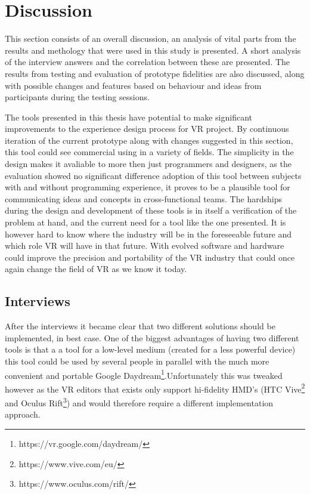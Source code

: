 
\chapter{Discussion}
\label{discussion}
This section consists of an overall discussion, an analysis of vital parts from the results and methology that were used in this study is presented. A short analysis of the interview answers and the correlation between these are presented. The results from testing and evaluation of prototype fidelities are also discussed, along with possible changes and features based on behaviour and ideas from participants during the testing sessions.

The tools presented in this thesis have potential to make significant improvements to the experience design process for VR project. By continuous iteration of the current prototype along with changes suggested in this section, this tool could see commercial using in a variety of fields. The simplicity in the design makes it avaliable to more then just programmers and designers, as the evaluation showed no significant difference adoption of this tool between subjects with and without programming experience, it proves to be a plausible tool for communicating ideas and concepts in cross-functional teams. The hardships during the design and development of these tools is in itself a verification of the problem at hand, and the current need for a tool like the one presented. It is however hard to know where the industry will be in the foreseeable future and which role VR will have in that future. With evolved software and hardware could improve the precision and portability of the VR industry that could once again change the field of VR as we know it today.

\section{Interviews}
After the interviews it became clear that two different solutions should be implemented, in best case. One of the biggest advantages of having two different tools is that a a tool for a low-level medium (created for a less powerful device) this tool could be used by several people in parallel with the much more convenient and portable Google Daydream\footnote{https://vr.google.com/daydream/}.Unfortunately this was tweaked however as the VR editors that exists only support hi-fidelity HMD's (HTC Vive\footnote{https://www.vive.com/eu/} and Oculus Rift\footnote{https://www.oculus.com/rift/}) and would therefore require a different implementation approach.

